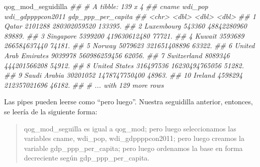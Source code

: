 \documentclass[]{book}
\newenvironment{Shaded}{\begin{snugshade}}{\end{snugshade}}
\newcommand{\CommentTok}[1]{\textcolor[rgb]{0.56,0.35,0.01}{\textit{#1}}}
\newcommand{\DataTypeTok}[1]{\textcolor[rgb]{0.13,0.29,0.53}{#1}}
\newcommand{\KeywordTok}[1]{\textcolor[rgb]{0.13,0.29,0.53}{\textbf{#1}}}
\newcommand{\NormalTok}[1]{#1}
\newcommand{\OperatorTok}[1]{\textcolor[rgb]{0.81,0.36,0.00}{\textbf{#1}}}
\newcommand{\StringTok}[1]{\textcolor[rgb]{0.31,0.60,0.02}{#1}}
\begin{document}
\begin{Shaded}
\end{Shaded}

\begin{Shaded}
\begin{Highlighting}[]
\NormalTok{qog_mod_seguidilla}
\CommentTok{## # A tibble: 139 x 4}
\CommentTok{##    cname                  wdi_pop wdi_gdppppcon2011 gdp_ppp_per_capita}
\CommentTok{##    <chr>                    <dbl>             <dbl>              <dbl>}
\CommentTok{##  1 Qatar                  2101288      280302059520            133395.}
\CommentTok{##  2 Luxembourg              543360       48842280960             89889.}
\CommentTok{##  3 Singapore              5399200      419630612480             77721.}
\CommentTok{##  4 Kuwait                 3593689      266584637440             74181.}
\CommentTok{##  5 Norway                 5079623      321651408896             63322.}
\CommentTok{##  6 United Arab Emirates   9039978      560986259456             62056.}
\CommentTok{##  7 Switzerland            8089346      444201566208             54912.}
\CommentTok{##  8 United States        316497536    16230494765056             51282.}
\CommentTok{##  9 Saudi Arabia          30201052     1478747750400             48963.}
\CommentTok{## 10 Ireland                4598294      212357021696             46182.}
\CommentTok{## # ... with 129 more rows}
\end{Highlighting}
\end{Shaded}

Las pipes pueden leerse como ``pero luego''. Nuestra seguidilla
anterior, entonces, se leería de la siguiente forma:

\begin{quote}
qog\_mod\_seguilla es igual a qog\_mod; pero luego seleccionamos las
variables cname, wdi\_pop, wdi\_gdppppcon2011; pero luego creamos la
variable gdp\_ppp\_per\_capita; pero luego ordenamos la base en forma
decreciente según gdp\_ppp\_per\_capita.
\end{quote}
\end{document}
